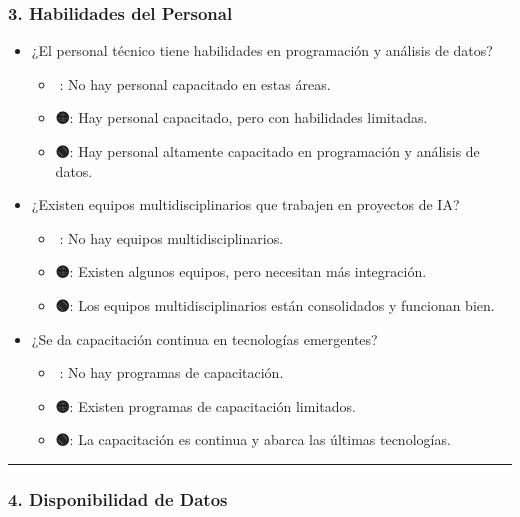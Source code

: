 \documentclass[
  10pt,
  letterpaper,
]{book}
\providecommand{\tightlist}{%
  \setlength{\itemsep}{0pt}\setlength{\parskip}{0pt}}\usepackage{longtable,booktabs,array}
\begin{document}
\subsubsection{\texorpdfstring{\textbf{3. Habilidades del
Personal}}{3. Habilidades del Personal}}\label{habilidades-del-personal}

\begin{itemize}
\tightlist
\item
  ¿El personal técnico tiene habilidades en programación y análisis de
  datos?

  \begin{itemize}
  \tightlist
  \item
    \textbf{🔴}: No hay personal capacitado en estas áreas.
  \item
    \textbf{🟡}: Hay personal capacitado, pero con habilidades
    limitadas.
  \item
    \textbf{🟢}: Hay personal altamente capacitado en programación y
    análisis de datos.
  \end{itemize}
\item
  ¿Existen equipos multidisciplinarios que trabajen en proyectos de IA?

  \begin{itemize}
  \tightlist
  \item
    \textbf{🔴}: No hay equipos multidisciplinarios.
  \item
    \textbf{🟡}: Existen algunos equipos, pero necesitan más
    integración.
  \item
    \textbf{🟢}: Los equipos multidisciplinarios están consolidados y
    funcionan bien.
  \end{itemize}
\item
  ¿Se da capacitación continua en tecnologías emergentes?

  \begin{itemize}
  \tightlist
  \item
    \textbf{🔴}: No hay programas de capacitación.
  \item
    \textbf{🟡}: Existen programas de capacitación limitados.
  \item
    \textbf{🟢}: La capacitación es continua y abarca las últimas
    tecnologías.
  \end{itemize}
\end{itemize}

\begin{center}\rule{0.5\linewidth}{0.5pt}\end{center}

\subsubsection{\texorpdfstring{\textbf{4. Disponibilidad de
Datos}}{4. Disponibilidad de Datos}}\label{disponibilidad-de-datos}
\end{document}
